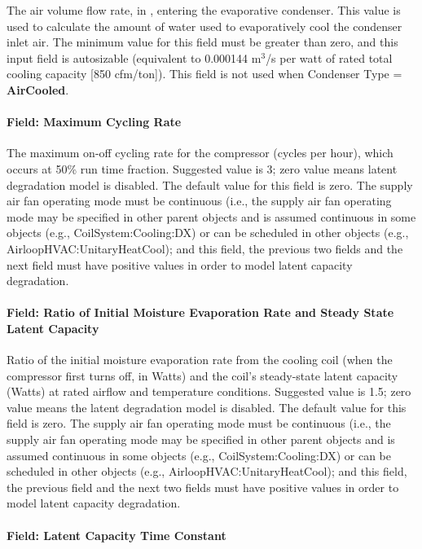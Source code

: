 The air volume flow rate, in \si{\volumeFlowRate}, entering the evaporative condenser. This value is used to calculate the amount of water used to evaporatively cool the condenser inlet air. The minimum value for this field must be greater than zero, and this input field is autosizable (equivalent to 0.000144 m\(^{3}\)/s per watt of rated total cooling capacity {[}850 cfm/ton{]}). This field is not used when Condenser Type = \textbf{AirCooled}.

\paragraph{Field: Maximum Cycling Rate}

The maximum on-off cycling rate for the compressor (cycles per hour), which occurs at 50\% run time fraction. Suggested value is 3; zero value means latent degradation model is disabled. The default value for this field is zero. The supply air fan operating mode must be continuous (i.e., the supply air fan operating mode may be specified in other parent objects and is assumed continuous in some objects (e.g., CoilSystem:Cooling:DX) or can be scheduled in other objects (e.g., AirloopHVAC:UnitaryHeatCool); and this field, the previous two fields and the next field must have positive values in order to model latent capacity degradation.

\paragraph{Field: Ratio of Initial Moisture Evaporation Rate and Steady State Latent Capacity}

Ratio of the initial moisture evaporation rate from the cooling coil (when the compressor first turns off, in Watts) and the coil's steady-state latent capacity (Watts) at rated airflow and temperature conditions. Suggested value is 1.5; zero value means the latent degradation model is disabled. The default value for this field is zero. The supply air fan operating mode must be continuous (i.e., the supply air fan operating mode may be specified in other parent objects and is assumed continuous in some objects (e.g., CoilSystem:Cooling:DX) or can be scheduled in other objects (e.g., AirloopHVAC:UnitaryHeatCool); and this field, the previous field and the next two fields must have positive values in order to model latent capacity degradation.

\paragraph{Field: Latent Capacity Time Constant}


